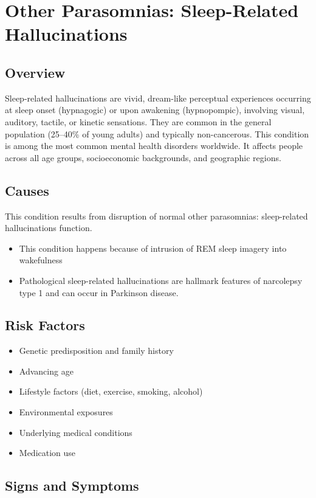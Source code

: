 \chapter{Other Parasomnias: Sleep-Related Hallucinations}
\label{sec:Sleep-Related Hallucinations}

\section{Overview}
Sleep-related hallucinations are vivid, dream-like perceptual experiences occurring at sleep onset (hypnagogic) or upon awakening (hypnopompic), involving visual, auditory, tactile, or kinetic sensations. They are common in the general population (25--40\% of young adults) and typically non-cancerous. This condition is among the most common mental health disorders worldwide. It affects people across all age groups, socioeconomic backgrounds, and geographic regions.
\section{Causes}
This condition results from disruption of normal other parasomnias: sleep-related hallucinations function.

\begin{itemize}[noitemsep]
  \item This condition happens because of intrusion of REM sleep imagery into wakefulness
  \item Pathological sleep-related hallucinations are hallmark features of narcolepsy type 1 and can occur in Parkinson disease.
\end{itemize}
\section{Risk Factors}


\begin{itemize}[noitemsep]
  \item Genetic predisposition and family history
  \item Advancing age
  \item Lifestyle factors (diet, exercise, smoking, alcohol)
  \item Environmental exposures
  \item Underlying medical conditions
  \item Medication use
\end{itemize}
\section{Signs and Symptoms}

